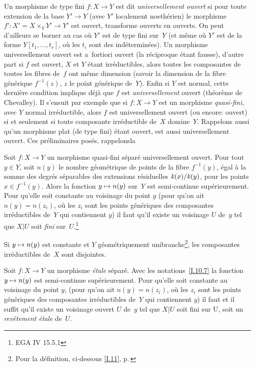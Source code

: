 Un morphisme de type fini $f\colon X\to Y$ est dit
\emph{universellement ouvert} si pour toute extension de la base
$Y'\to Y$ (avec $Y'$ localement noeth\'erien) le morphisme $f'\colon
X'=X\times_Y Y'\to Y'$ est ouvert, \ie transforme ouverts en
ouverts. On peut d'ailleurs se borner au cas o\`u $Y'$ est de type
fini sur~$Y$ (et m\^eme o\`u $Y'$ est de la forme
$Y[t_1,\dots,t_r]$, o\`u les $t_i$ sont des ind\'etermin\'ees).
Un morphisme universellement ouvert est a~fortiori ouvert (la
r\'eciproque \'etant fausse), d'autre part si $f$ est ouvert, $X$
et $Y$ \'etant irr\'eductibles, alors toutes les composantes de
toutes les fibres de~$f$ ont m\^eme dimension (savoir la dimension de
la fibre g\'en\'erique
$f^{-1}(z)$, $z$ le point g\'en\'erique
de~$Y$). Enfin si $Y$ est normal, cette derni\`ere condition
implique d\'ej\`a que $f$ est \emph{universellement} ouvert
(th\'eor\`eme de Chevalley). Il s'ensuit par exemple que si
$f\colon X\to Y$ est un morphisme \emph{quasi-fini}, avec $Y$ normal
irr\'eductible, alors $f$ est universellement
ouvert
(ou encore:
ouvert)
si et seulement si toute composante irr\'eductible de~$X$
domine~$Y$. Rappelons aussi qu'un morphisme plat (de type fini)
\'etant ouvert, est aussi universellement ouvert. Ces
pr\'eliminaires pos\'es, \og rappelons\fg la

\begin{proposition}
\label{I.10.7}
Soit $f\colon X\to Y$ un morphisme quasi-fini s\'epar\'e
universellement ouvert. Pour tout $y\in Y$, soit $n(y)$ le \og nombre
g\'eom\'etrique de points de la fibre $f^{-1}(y)$\fg, \'egal
\`a la somme des degr\'es s\'eparables des extensions
r\'esiduelles
$\mathit{k}(x)/\mathit{k}(y)$, pour les points $x\in f^{-1}(y)$. Alors
la fonction $y\mto n(y)$ sur~$Y$ est semi-continue
sup\'erieurement. Pour qu'elle soit constante au voisinage du point
$y$ (\ie pour qu'on ait $n(y)=n(z_i)$, o\`u les $z_i$ sont les
points g\'en\'eriques des composantes irr\'eductibles de~$Y$ qui
contiennent $y$) il faut qu'il existe un voisinage $U$ de~$y$ tel que
$X|U$ soit \emph{fini} sur~$U$.\footnote{\Cf EGA IV 15.5.1}
\end{proposition}

\begin{corollaire}
\label{I.10.8}
Si $y\mto n(y)$ est constante et $Y$ g\'eom\'etriquement
unibranche\footnote{Pour la d\'efinition, \cf ci-dessous
\no \ref{I.11}, p.\, \pageref{I.11}}, les composantes irr\'eductibles
de~$X$ sont disjointes.
\end{corollaire}

\begin{proposition}
\label{I.10.9}
Soit $f\colon X\to Y$ un morphisme \emph{étale} s\'epar\'e.
Avec les notations~\ref{I.10.7} la fonction $y\mto n(y)$ est
semi-continue sup\'erieurement. Pour qu'elle soit constante au
voisinage du point $y$, (\ie pour qu'on ait $n(y)=n(z_i)$, o\`u
les $z_i$ sont les points g\'en\'eriques des composantes
irr\'eductibles de~$Y$ qui contiennent $y$) il faut et il suffit
qu'il existe un voisinage ouvert $U$ de~$y$ tel que $X|U$ soit fini
sur U, \ie soit un \emph{revêtement étale} de~$U$.
\end{proposition}

